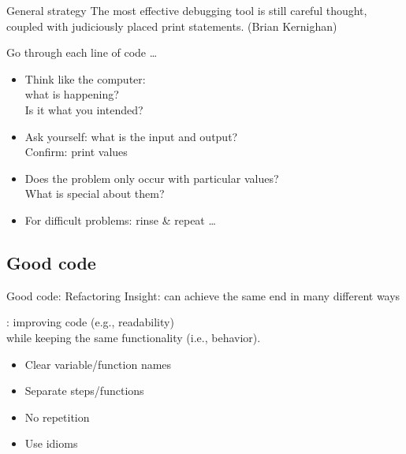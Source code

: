 \documentclass[aspectratio=169,usenames,dvipsnames]{beamer}
\begin{document}
\begin{frame}{General strategy}
    The most effective debugging tool is still careful thought, coupled with
    judiciously placed print statements. (Brian Kernighan)
    
    \pause\vspace{1em}
    Go through each line of code \dots
    \begin{itemize}
        \item Think like the computer: \\
            what is happening? \\
            Is it what you intended?
        \item Ask yourself: what is the input and output? \\
            Confirm: print values
        \item Does the problem only occur with particular values? \\
            What is special about them?
        \item For difficult problems: rinse \& repeat \dots
    \end{itemize}
\end{frame}



\subsection{Good code}
\begin{frame}{Good code: Refactoring}
    Insight: can achieve the same end in many different ways

    \pause
    \begin{definition}
        : improving code (e.g., readability) \\
            while keeping the same functionality (i.e., behavior).
    \end{definition}

    \begin{itemize}
        \item Clear variable/function names
        \item Separate steps/functions
        \item No repetition
        \item Use idioms
    \end{itemize}
\end{frame}
\end{document}
